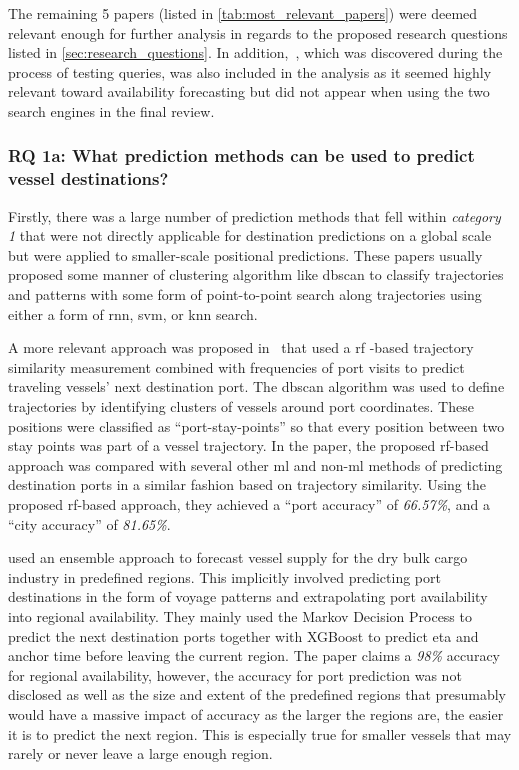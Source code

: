 The remaining \textbf{}5 papers (listed in \cref{tab:most_relevant_papers}) were deemed relevant enough for further analysis in regards to the proposed research questions listed in \cref{sec:research_questions}. In addition,~\cite{lechtenberg2019}, which was discovered during the process of testing queries, was also included in the analysis as it seemed highly relevant toward availability forecasting but did not appear when using the two search engines in the final review.

\subsubsection{RQ 1a: What prediction methods can be used to predict vessel destinations?}

Firstly, there was a large number of prediction methods that fell within \textit{category 1} that were not directly applicable for destination predictions on a global scale but were applied to smaller-scale positional predictions. These papers usually proposed some manner of clustering algorithm like \acrshort{dbscan} to classify trajectories and patterns with some form of point-to-point search along trajectories using either a form of \acrfull{rnn}, \acrfull{svm}, or \acrfull{knn} search.

A more relevant approach was proposed in~\cite{Zhang2020AISApproach} that used a \acrfull{rf} -based trajectory similarity measurement combined with frequencies of port visits to predict traveling vessels' next destination port. The \acrshort{dbscan} algorithm was used to define trajectories by identifying clusters of vessels around port coordinates. These positions were classified as ``port-stay-points'' so that every position between two stay points was part of a vessel trajectory. In the paper, the proposed \acrshort{rf}-based approach was compared with several other \acrshort{ml} and non-\acrshort{ml} methods of predicting destination ports in a similar fashion based on trajectory similarity. Using the proposed \acrshort{rf}-based approach, they achieved a ``port accuracy'' of \textit{66.57\%}, and a ``city accuracy'' of \textit{81.65\%}.

\cite{lechtenberg2019} used an ensemble approach to forecast vessel supply for the dry bulk cargo industry in predefined regions. This implicitly involved predicting port destinations in the form of voyage patterns and extrapolating port availability into regional availability. They mainly used the Markov Decision Process to predict the next destination ports together with XGBoost to predict \acrshort{eta} and anchor time before leaving the current region. The paper claims a \textit{98\%} accuracy for regional availability, however, the accuracy for port prediction was not disclosed as well as the size and extent of the predefined regions that presumably would have a massive impact of accuracy as the larger the regions are, the easier it is to predict the next region. This is especially true for smaller vessels that may rarely or never leave a large enough region.

